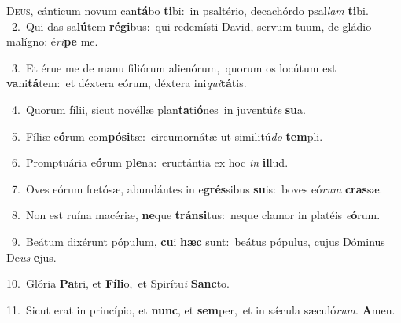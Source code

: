 \lettrine{\initial\textcolor{\initialcolor}{D}}{eus,} cánticum novum can\-\textbf{tá}\-bo \textbf{ti}\-bi:~\star in psaltério, decachórdo psal\textit{lam} \textbf{ti}\-bi.\\
{\numbfont\textcolor{\numbcolor}{~2.}}~Qui das sa\-\textbf{lú}\-tem \textbf{ré}\-\textbf{gi}bus:~\star qui redemísti David, servum tuum, de gládio malígno: é\-\textit{ri}\-\textbf{pe} me.\par
{\numbfont\textcolor{\numbcolor}{~3.}}~Et érue me de manu filiórum alienórum,~\dagger quorum os locútum est \textbf{va}\-ni\-\textbf{tá}\-tem:~\star et déxtera eórum, déxtera ini\-\textit{qui}\-\textbf{tá}tis.\par
{\numbfont\textcolor{\numbcolor}{~4.}}~Quorum fílii, sicut novéllæ plan\-\textbf{ta}\-ti\-\textbf{ó}\-nes~\star in juventú\textit{te} \textbf{su}\-a.\par
{\numbfont\textcolor{\numbcolor}{~5.}}~Fíliæ e\-\textbf{ó}\-rum com\-\textbf{pó}\-\textbf{si}tæ:~\star circumornátæ ut similitú\textit{do} \textbf{tem}\-pli.\par
{\numbfont\textcolor{\numbcolor}{~6.}}~Promptuária e\-\textbf{ó}\-rum \textbf{ple}\-na:~\star eructántia ex hoc \textit{in} \textbf{il}\-lud.\par
{\numbfont\textcolor{\numbcolor}{~7.}}~Oves eórum fœtósæ, abundántes in e\-\textbf{grés}\-sibus \textbf{su}\-is:~\star boves eó\textit{rum} \textbf{cras}\-sæ.\par
{\numbfont\textcolor{\numbcolor}{~8.}}~Non est ruína macériæ, \textbf{ne}\-que \textbf{tráns}\-\textbf{i}tus:~\star neque clamor in platéis \textit{e}\-\textbf{ó}rum.\par
{\numbfont\textcolor{\numbcolor}{~9.}}~Beátum dixérunt pópulum, \textbf{cu}\-i \textbf{hæc} sunt:~\star beátus pópulus, cujus Dóminus De\textit{us} \textbf{e}\-jus.\par
{\numbfont\textcolor{\numbcolor}{10.}}~Glória \textbf{Pa}\-tri, et \textbf{Fí}\-\textbf{li}o,~\star et Spirítu\textit{i} \textbf{Sanc}\-to.\par
{\numbfont\textcolor{\numbcolor}{11.}}~Sicut erat in princípio, et \textbf{nunc}\-, et \textbf{sem}\-per,~\star et in sǽcula sæculó\-\textit{rum}\-. \textbf{A}\-men.\par
